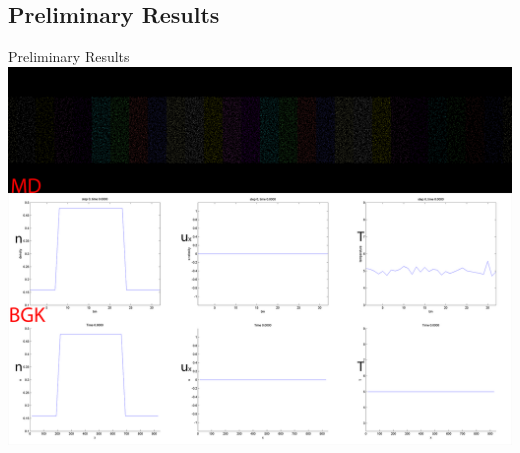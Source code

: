 \documentclass{beamer}
\begin{document}
	
	\subsection{Preliminary Results}
	\begin{frame}{Preliminary Results}
		\includegraphics[width=1.0\textwidth]{BGK_MD_movie0000.png}
	\end{frame}
	
\end{document}
